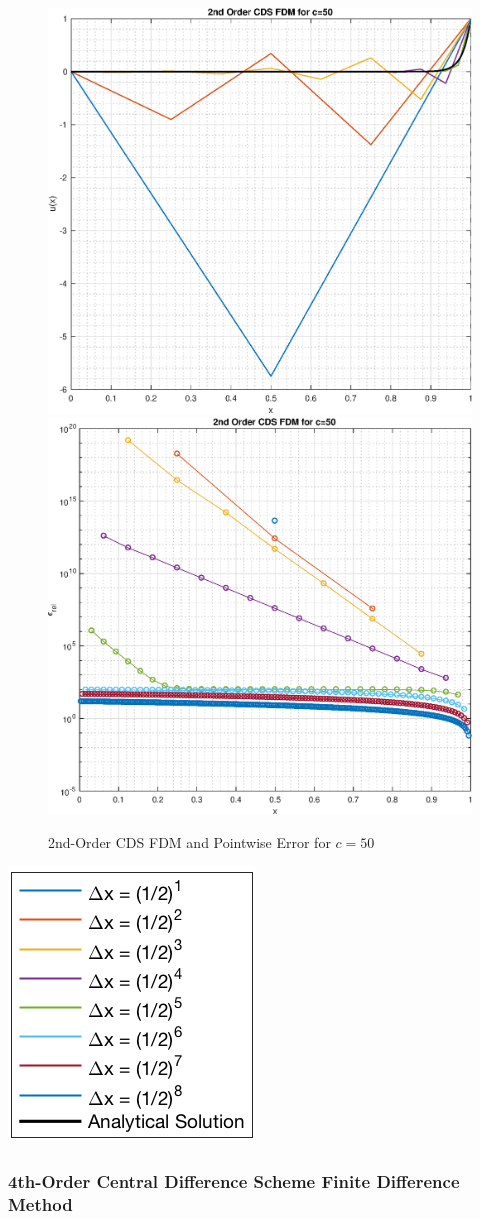 \documentclass[10pt, reqno]{article}		%
\numberwithin{equation}{section}
\begin{document}
\begin{figure}[H]
	\begin{center}
		\includegraphics[width = 0.49\linewidth]{solution_2nd_order_cds_c_50}
		\includegraphics[width = 0.49\linewidth]{pointwise_error_2nd_order_cds_c_50}
		\caption{2nd-Order CDS FDM and Pointwise Error for $c = 50$}
	\end{center}
\end{figure}

\begin{center}
	\includegraphics[height = 0.25\linewidth]{legend}
\end{center}

\newpage

\subsubsection{4th-Order Central Difference Scheme Finite Difference Method}
\end{document}
